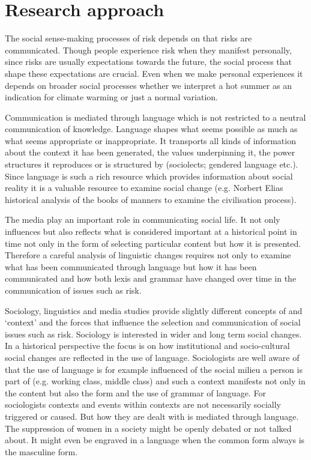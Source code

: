 \section{Research approach}

The social sense-making processes of risk depends on that risks are communicated. Though people experience risk when they manifest personally, since risks are usually expectations towards the future, the social process that shape these expectations are crucial. Even when we make personal experiences it depends on broader social processes whether we interpret a hot summer as an indication for climate warming or just a normal variation.

Communication is mediated through language which is not restricted to a neutral communication of knowledge. Language shapes what seems possible as much as what seems appropriate or inappropriate. It transports all kinds of information about the context it has been generated, the values underpinning it, the power structures it reproduces or is structured by (sociolects; gendered language etc.). Since language is such a rich resource which provides information about social reality it is a valuable resource to examine social change (e.g. Norbert Elias historical analysis of the books of manners to examine the civilisation process). 

The media play an important role in communicating social life. It not only influences but also reflects what is considered important at a historical point in time not only in the form of selecting particular content but how it is presented. Therefore a careful analysis of linguistic changes requires not only to examine what has been communicated through language but how it has been communicated and how both lexis and grammar have changed over time in the communication of issues such as risk.

Sociology, linguistics and media studies provide slightly different concepts of and `context' and the forces that influence the selection and communication of social issues such as risk. Sociology is interested in wider and long term social changes. In a historical perspective the focus is on how institutional and socio-cultural social changes are reflected in the use of language. Sociologists are well aware of that the use of language is for example influenced of the social milieu a person is part of (e.g. working class, middle class) and such a context manifests not only in the content but also the form and the use of grammar of language. For sociologists contexts and events within contexts are not necessarily socially triggered or caused. But how they are dealt with is mediated through language. The suppression of women in a society might be openly debated or not talked about. It might even be engraved in a language when the common form always is the masculine form. 

